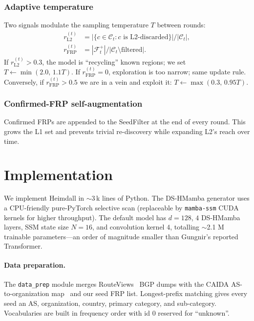 \documentclass[conference]{IEEEtran}
\begin{document}
\subsubsection{Adaptive temperature}
Two signals modulate the sampling temperature $T$ between rounds:
\begin{align}
   r_{\mathrm{L2}}^{(t)} &= |\{c\in\mathcal C_t : c\text{ is L2-discarded}\}| / |\mathcal C_t|,\\
   r_{\mathrm{FRP}}^{(t)} &= |\mathcal F_t^{+}| / |\mathcal C_t \setminus \text{filtered}|.
\end{align}
If $r_{\mathrm{L2}}^{(t)}>0.3$, the model is ``recycling'' known
regions; we set $T\leftarrow\min(2.0,\,1.1T)$.  If
$r_{\mathrm{FRP}}^{(t)}=0$, exploration is too narrow; same update
rule.  Conversely, if $r_{\mathrm{FRP}}^{(t)}>0.5$ we are in a vein and
exploit it: $T\leftarrow\max(0.3,\,0.95T)$.

\subsubsection{Confirmed-FRP self-augmentation}
Confirmed FRPs are appended to the SeedFilter at the end of every
round.  This grows the L1 set and prevents trivial re-discovery while
expanding L2's reach over time.

\section{Implementation}\label{sec:impl}

We implement Heimdall in $\sim$3\,k lines of Python.  The
DS-HMamba generator uses a CPU-friendly pure-PyTorch selective scan
(replaceable by \texttt{mamba-ssm} CUDA kernels for higher throughput).
The default model has $d{=}128$, $4$ DS-HMamba layers, SSM state size
$N{=}16$, and convolution kernel $4$, totalling $\sim$2.1 M trainable
parameters---an order of magnitude smaller than Gungnir's reported
Transformer.

\paragraph{Data preparation.}  The \texttt{data\_prep} module merges
RouteViews~\cite{routeviews} BGP dumps with the
CAIDA AS-to-organization map~\cite{caida-as2org} and our seed FRP
list.  Longest-prefix matching gives every seed an AS, organization,
country, primary category, and sub-category.  Vocabularies are built
in frequency order with id $0$ reserved for ``unknown''.
\end{document}
